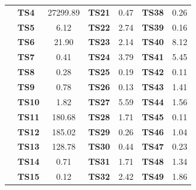 \begin{table}[h]
{\begin{tabular}{|l|l|S[table-format=3.2]|l|S[table-format=3.2]|l|S[table-format=3.2]|}
		& \textbf{TS4}       & 27299.89 & \textbf{TS21}      & 0.47                          & \textbf{TS38}      & 0.26                           \\  
		& \textbf{TS5}       & 6.12                             & \textbf{TS22}      & 2.74                          & \textbf{TS39}      & 0.16                           \\  
		& \textbf{TS6}       & 21.90                            & \textbf{TS23}      & 2.14                          & \textbf{TS40}      & 8.12                           \\  
		& \textbf{TS7}       & 0.41                             & \textbf{TS24}      & 3.79                          & \textbf{TS41}      & 5.45                           \\  
		& \textbf{TS8}       & 0.28                             & \textbf{TS25}      & 0.19                          & \textbf{TS42}      & 0.11                           \\  
		& \textbf{TS9}       & 0.78                             & \textbf{TS26}      & 0.13                          & \textbf{TS43}      & 1.41                           \\  
		& \textbf{TS10}      & 1.82                             & \textbf{TS27}      & 5.59                          & \textbf{TS44}      & 1.56                           \\  
		& \textbf{TS11}      & 180.68   & \textbf{TS28}      & 1.71                          & \textbf{TS45}      & 0.11                           \\  
		& \textbf{TS12}      & 185.02   & \textbf{TS29}      & 0.26                          & \textbf{TS46}      & 1.04                           \\  
		& \textbf{TS13}      & 128.78   & \textbf{TS30}      & 0.44                          & \textbf{TS47}      & 0.23                           \\  
		& \textbf{TS14}      & 0.71                             & \textbf{TS31}      & 1.71                          & \textbf{TS48}      & 1.34                           \\  
		& \textbf{TS15}      & 0.12                             & \textbf{TS32}      & 2.42                          & \textbf{TS49}      & 1.86                           \\  

\end{tabular}}
\end{table}
